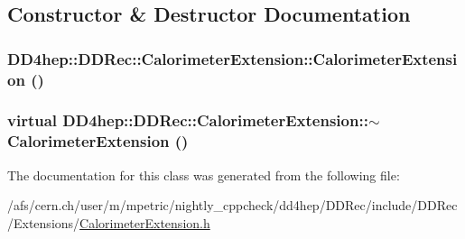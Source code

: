 \subsection{Constructor \& Destructor Documentation}
\hypertarget{class_d_d4hep_1_1_d_d_rec_1_1_calorimeter_extension_a825366de862b94c746fe49432591406b}{
\subsubsection[{CalorimeterExtension}]{\setlength{\rightskip}{0pt plus 5cm}DD4hep::DDRec::CalorimeterExtension::CalorimeterExtension ()}}
\label{class_d_d4hep_1_1_d_d_rec_1_1_calorimeter_extension_a825366de862b94c746fe49432591406b}
\hypertarget{class_d_d4hep_1_1_d_d_rec_1_1_calorimeter_extension_a387851f2812749225010c8e3d174724f}{
\subsubsection[{$\sim$CalorimeterExtension}]{\setlength{\rightskip}{0pt plus 5cm}virtual DD4hep::DDRec::CalorimeterExtension::$\sim$CalorimeterExtension ()}}
\label{class_d_d4hep_1_1_d_d_rec_1_1_calorimeter_extension_a387851f2812749225010c8e3d174724f}


The documentation for this class was generated from the following file:\begin{DoxyCompactItemize}
\item 
/afs/cern.ch/user/m/mpetric/nightly\_\-cppcheck/dd4hep/DDRec/include/DDRec/Extensions/\hyperlink{_calorimeter_extension_8h}{CalorimeterExtension.h}\end{DoxyCompactItemize}
